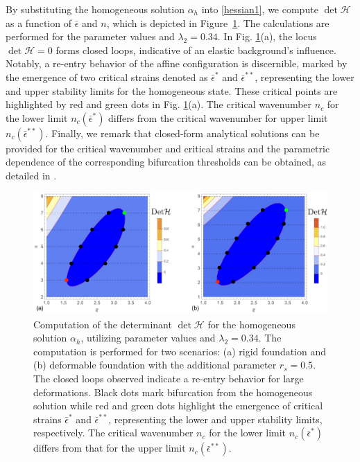 % 
By substituting the homogeneous solution $\alpha_h$ into \eqref{hessian1}, we compute $\det \mathcal{H}$ as a function of $\bar \epsilon$ and $n$, which is depicted in Figure~\ref{fig:hessian1}. The calculations are performed for the parameter values  and $\lambda_2=0.34$.
In Fig. \ref{fig:hessian1}(a), the locus $\det \mathcal H=0$ forms closed loops, indicative of an elastic background's influence. Notably, a re-entry behavior of the affine configuration is discernible, marked by the emergence of two critical strains denoted as $\bar\epsilon^*$ and $\bar\epsilon^{**}$, representing the lower and upper stability limits for the homogeneous state. These critical points are highlighted by red and green dots in Fig. \ref{fig:hessian1}(a). The critical wavenumber $n_c$ for the lower limit $n_c(\bar{\epsilon}^*)$    differs from the critical wavenumber for  upper limit $n_c(\bar{\epsilon}^{**})$. Finally, we remark that closed-form analytical solutions can be provided for the critical wavenumber and critical strains and the parametric dependence of the corresponding bifurcation thresholds can be obtained, as detailed in \cite{Salman2021-mn}.


\begin{figure}
     \centering
     \includegraphics[scale=0.25]{./final_images/fig1.pdf}
\caption{
Computation of the determinant $\det \mathcal{H}$ for the homogeneous solution $\alpha_h$, utilizing parameter values  and $\lambda_2 = 0.34$. The computation is performed for two scenarios: (a) rigid foundation and (b) deformable foundation with the additional parameter $r_s=0.5$. The closed loops observed indicate a re-entry behavior for large deformations. Black dots mark bifurcation from the homogeneous solution while red and green dots highlight the emergence of critical strains $\bar{\epsilon}^*$ and $\bar{\epsilon}^{**}$, representing the lower and upper stability limits, respectively. The critical wavenumber $n_c$ for the lower limit $n_c(\bar{\epsilon}^*)$ differs from that for the upper limit $n_c(\bar{\epsilon}^{**})$.}
     \label{fig:hessian1}
 \end{figure}


